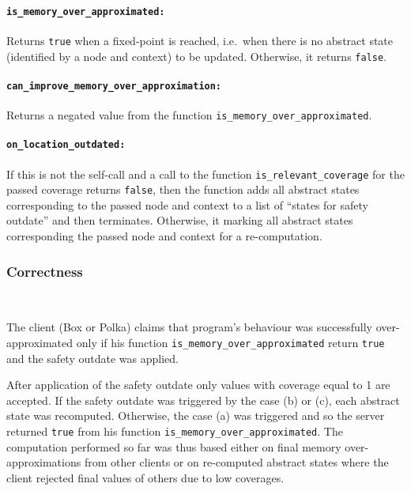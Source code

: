 \documentclass[envcountsame]{llncs}
\begin{document}
\paragraph{\tt is\_memory\_over\_approximated: }

Returns \texttt{true} when a fixed-point is reached, i.e.~when there is no
abstract state (identified by a node and context) to be updated. Otherwise, it
returns \texttt{false}.

\paragraph{\tt can\_improve\_memory\_over\_approximation: }

Returns a negated value from the function \texttt{is\_memory\_over\_approximated}.

\paragraph{\tt on\_location\_outdated: }

If this is not the self-call and a call to the function
\texttt{is\_relevant\_coverage} for the passed coverage returns \texttt{false},
then the function adds all abstract states corresponding to the passed node and
context to a list of ``states for safety outdate'' and then terminates.
Otherwise, it marking all abstract states corresponding the passed node and
context for a re-computation.

\subsubsection{Correctness}~\\
\label{sec:CorrectnessBoxPolka}

The client (Box or Polka) claims that program's behaviour was successfully
over-approximated only if his function \texttt{is\_memory\_over\_approximated}
return \texttt{true} and the safety outdate was applied.

After application of the safety outdate only values with coverage equal to 1 are
accepted. If the safety outdate was triggered by the case (b) or (c), each
abstract state was recomputed. Otherwise, the case (a) was triggered and so the
server returned \texttt{true} from his function
\texttt{is\_memory\_over\_approximated}. The computation performed so far was
thus based either on final memory over-approximations from other clients or on
re-computed abstract states where the client rejected final values of others due
to low coverages.
\end{document}
